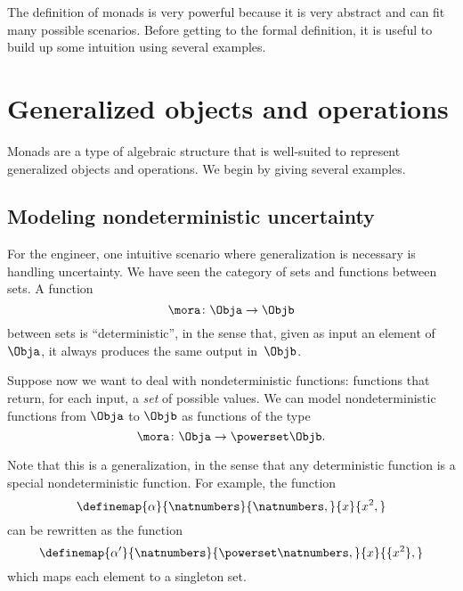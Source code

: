 

The definition of monads is very powerful because it is very abstract and can fit many possible scenarios.
Before getting to the formal definition, it is useful to build up some intuition using several examples.


\section{Generalized objects and operations}


Monads are a type of algebraic structure that is well-suited to represent generalized objects and operations.
We begin by giving several examples.

\subsection{Modeling nondeterministic uncertainty}

For the engineer, one intuitive scenario where generalization is necessary is handling uncertainty.
We have seen the category  \Set of sets and functions between sets.
A function
\begin{equation}
    \label{eq:monad-simple}
    \mora\colon\Obja\to\Objb
\end{equation}
between sets is ``deterministic'', in the sense that, given as input an element of~$\Obja$, it always produces the same output in~$\Objb$.

Suppose now we want to deal with nondeterministic functions: functions that return, for each input, a \emph{set} of possible values.
We can model nondeterministic functions from $\Obja$ to $\Objb$ as functions of the type
\begin{equation}
    \label{eq:monad-generalized}
    \mora\colon\Obja\to\powerset\Objb.
\end{equation}

Note that this is a generalization, in the sense that any deterministic function is a special nondeterministic function.
For example, the function
%
\begin{equation}
    \label{eq:monad-alpha-example1}
    \definemap{\alpha}{\natnumbers}{\natnumbers,}%
    {x}{x^2,}
\end{equation}
%
can be rewritten as the function
%
\begin{equation}
    \label{eq:monad-alpha-example2}
    \definemap{\alpha'}{\natnumbers}{\powerset\natnumbers,}%
    {x}{\{x^2\},}
\end{equation}
%
which maps each element to a singleton set.

